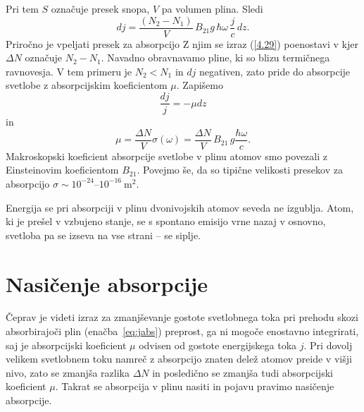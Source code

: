 Pri tem $S$ označuje presek snopa, $V$ pa volumen plina. Sledi
\begin{equation}
dj=\frac{(N_{2}-N_{1})}{V}\, B_{21}g\, \hbar\omega\,\frac{j}{c}\, dz.
\label{4.29}
\end{equation}
Priročno je vpeljati presek za absorpcijo 
Z njim se izraz (\ref{4.29}) poenostavi v 
kjer $\Delta N$ označuje $N_{2}-N_{1}$.
Navadno obravnavamo pline, ki so blizu termičnega ravnovesja. V tem primeru 
je $N_{2}<N_{1}$ in $dj$ negativen, zato pride do
absorpcije svetlobe z absorpcijskim koeficientom
$\mu$. Zapišemo 
\begin{equation}
\frac{dj}{j} = -\mu dz
\label{eq:jabs}
\end{equation}
in
\begin{equation}
\mu=\frac{\Delta N}{V}\sigma(\omega)=
\frac{\Delta N}{V}\, B_{21}\, g\frac{\hbar\omega}{c}.
\label{eq:muabs1}
\end{equation}
Makroskopski koeficient absorpcije svetlobe v plinu atomov smo povezali
z Einsteinovim koefici\-entom $B_{21}$. Povejmo še, da so 
tipične velikosti presekov za absorpcijo $\sigma \sim 10^{-24}$--$10^{-16}~\si{\metre^2}$.

\begin{remark}
Energija se pri absorpciji v plinu dvonivojskih atomov seveda
ne izgublja. Atom, ki je prešel v vzbujeno stanje, se s spontano 
emisijo vrne nazaj v osnovno, svetloba pa se izseva na vse strani -- se siplje. 
\end{remark}

\section{Nasičenje absorpcije}
\label{chap:NasAbs}
Čeprav je videti izraz za zmanjševanje 
gostote svetlobnega toka pri prehodu skozi absorbirajoči plin (enačba~\ref{eq:jabs}) 
preprost, ga ni mogoče enostavno integrirati, saj je absorpcijski koeficient 
$\mu$ odvisen od 
gostote energijskega toka $j$. Pri dovolj velikem svetlobnem toku namreč z 
absorpcijo znaten delež atomov preide v višji nivo, zato se zmanjša razlika $\Delta N$
in posledično se zmanjša tudi absorpcijski koeficient $\mu$. Takrat se absorpcija
v plinu nasiti in pojavu pravimo nasičenje absorpcije.

